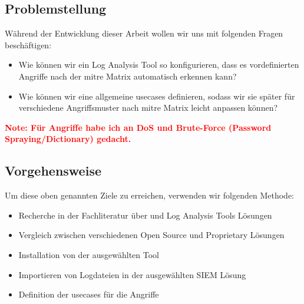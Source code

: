\subsection{Problemstellung}
Während der Entwicklung dieser Arbeit wollen wir uns mit folgenden Fragen beschäftigen:

\begin{itemize}
   \item Wie können wir ein Log Analysis Tool so konfigurieren, dass es vordefinierten Angriffe nach der \gls{mitre} Matrix automatisch erkennen kann?
   \item Wie können wir eine allgemeine \gls{usecases} definieren, sodass wir sie später für verschiedene Angriffsmuster nach \gls{mitre} Matrix leicht anpassen können?
\end{itemize}

\textcolor{red}{\textbf{Note: Für Angriffe habe ich an DoS und Brute-Force (Password Spraying/Dictionary) gedacht.}}


\subsection{Vorgehensweise}
Um diese oben genannten Ziele zu erreichen, verwenden wir folgenden Methode:

\begin{itemize}[noitemsep]
   \item Recherche in der Fachliteratur über  und Log Analysis Tools Lösungen
   \item Vergleich zwischen verschiedenen \gls{Open Source} und \gls{Proprietary} Lösungen
   \item Installation von der ausgewählten Tool  
   \item Importieren von Logdateien in der ausgewählten \gls{SIEM} Lösung
   \item Definition der \gls{usecases} für die Angriffe
\end{itemize}


